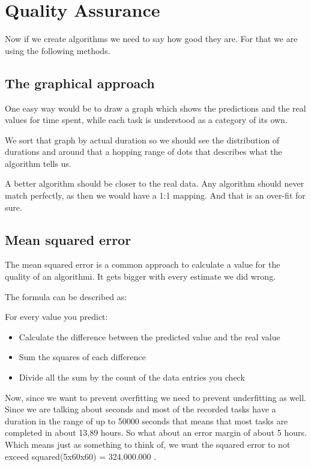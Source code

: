 \newpage{}

\hypertarget{quality-assurance}{%
\section{Quality Assurance}\label{quality-assurance}}

Now if we create algorithms we need to say how good they are. For that
we are using the following methods.

\hypertarget{the-graphical-approach}{%
\subsection{The graphical approach}\label{the-graphical-approach}}

One easy way would be to draw a graph which shows the predictions and
the real values for time spent, while each task is understood as a
category of its own.

We sort that graph by actual duration so we should see the distribution
of durations and around that a hopping range of dots that describes what
the algorithm tells us.

A better algorithm should be closer to the real data. Any algorithm
should never match perfectly, as then we would have a 1:1 mapping. And
that is an over-fit for sure.

\hypertarget{mean-squared-error}{%
\subsection{Mean squared error}\label{mean-squared-error}}

The mean squared error is a common approach to calculate a value for the
quality of an algorithmi. It gets bigger with every estimate we did
wrong.

The formula can be described as:

For every value you predict:

\begin{itemize}
\tightlist
\item
  Calculate the difference between the predicted value and the real
  value
\item
  Sum the squares of each difference
\item
  Divide all the sum by the count of the data entries you check
\end{itemize}

Now, since we want to prevent overfitting we need to prevent
underfitting as well. Since we are talking about seconds and most of the
recorded tasks have a duration in the range of up to 50000 seconds that
means that most tasks are completed in about 13,89 hours. So what about
an error margin of about 5 hours. Which means just as something to think
of, we want the squared error to not exceed squared(5x60x60) =
324.000.000 .

